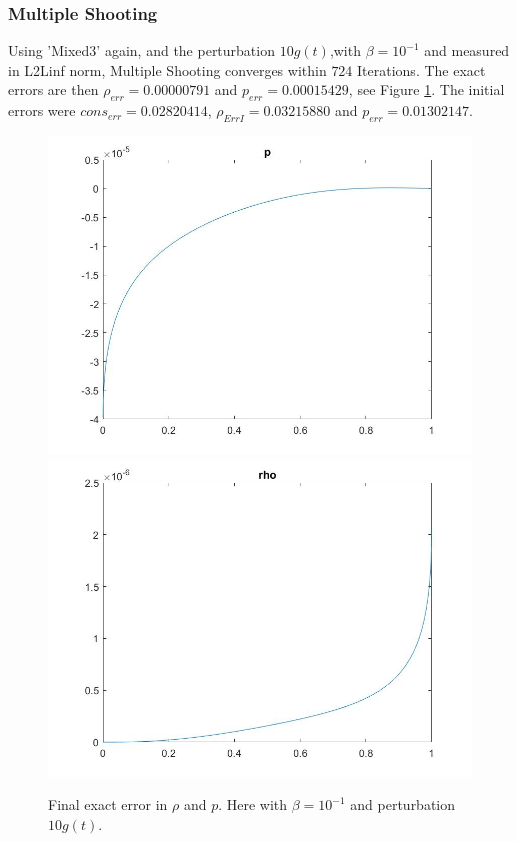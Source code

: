 \documentclass[11pt, a4paper]{article}
\theoremstyle{definition}
\begin{document}
\subsubsection*{Multiple Shooting}
Using 'Mixed3' again, and the perturbation $10g(t)$,with $\beta=10^{-1}$ and measured in L2Linf norm, Multiple Shooting converges within $724$ Iterations. The exact errors are then $\rho_{err} = 0.00000791$ and $p_{err}=0.00015429$, see Figure \ref{Figlint5}. The initial errors were $cons_{err} = 0.02820414$, $\rho_{ErrI} = 0.03215880$ and $p_{err} = 0.01302147$. 

\begin{figure}[h]
	\includegraphics[scale=0.3]{MultMD1.jpg}
	\includegraphics[scale=0.3]{MultMD2.jpg}
	\caption{Final exact error in $\rho$ and $p$. Here with $\beta =10^{-1}$ and perturbation $10g(t)$.}
	\label{Figlint5}
\end{figure}
\end{document}

